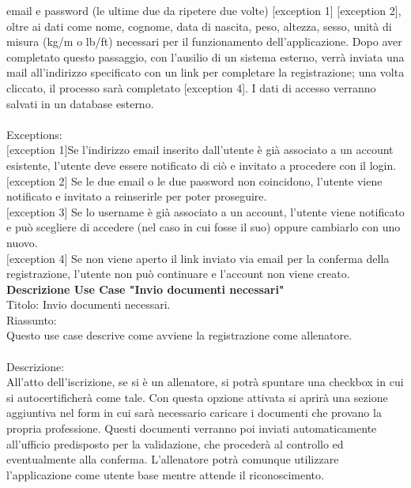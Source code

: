 \documentclass{article}
\begin{document}
email e password (le ultime due da ripetere due volte) [exception 1] [exception 2], oltre ai dati come nome, cognome, data di nascita, peso,
altezza, sesso, unità di misura (kg/m o lb/ft) necessari per il funzionamento dell’applicazione. Dopo aver completato questo passaggio, con l’ausilio
di un sistema esterno, verrà inviata una mail all’indirizzo specificato con un link per completare la registrazione; una volta cliccato, il processo
sarà completato [exception 4]. I dati di accesso verranno salvati in un database esterno.\\
\\
Exceptions:\\
$[$exception 1$]$Se l’indirizzo email inserito dall’utente è già associato a un account esistente, l’utente deve essere notificato di ciò e
invitato a procedere con il login.\\
$[$exception 2$]$ Se le due email o le due password non coincidono, l’utente viene notificato e invitato a reinserirle per poter proseguire.\\
$[$exception 3$]$ Se lo username è già associato a un account, l’utente viene notificato e può scegliere di accedere (nel caso in cui fosse il suo)
oppure cambiarlo con uno nuovo.\\
$[$exception 4$]$ Se non viene aperto il link inviato via email per la conferma della registrazione, l’utente non può continuare e l’account non
viene creato.\\
\newline
\newline
\textbf{Descrizione Use Case "Invio documenti necessari"}\\
\newline
Titolo: Invio documenti necessari.\\
\newline
Riassunto:\\
Questo use case descrive come avviene la registrazione come allenatore.\\
\\
Descrizione: \\
All’atto dell’iscrizione, se si è un allenatore, si potrà spuntare una checkbox in cui si autocertificherà come tale. Con questa opzione attivata
si aprirà una sezione aggiuntiva nel form in cui sarà necessario caricare i documenti che provano la propria professione. Questi documenti verranno
poi inviati automaticamente all’ufficio predisposto per la validazione, che procederà al controllo ed eventualmente alla conferma. L’allenatore
potrà comunque utilizzare l’applicazione come utente base mentre attende il riconoscimento.\\
\end{document}
